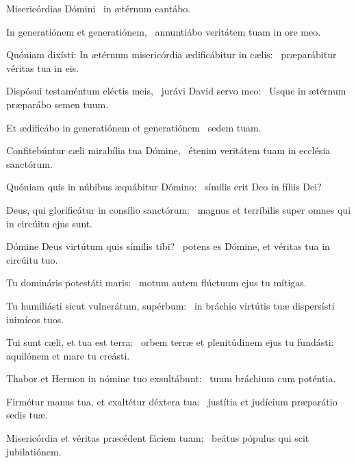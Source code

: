 \item Misericórdias Dómini~\psstar{} in ætérnum cantábo.

\item In generatiónem et generatiónem,~\psstar{} annuntiábo veritátem tuam in ore meo.

\item Quóniam dixísti: In ætérnum misericórdia ædificábitur in cælis:~\psstar{} præparábitur véritas tua in eis.

\item Dispósui testaméntum eléctis meis,~\pscross{} jurávi David servo meo:~\psstar{} Usque in ætérnum præparábo semen tuum.

\item Et ædificábo in generatiónem et generatiónem~\psstar{} sedem tuam.

\item Confitebúntur cæli mirabília tua Dómine,~\psstar{} étenim veritátem tuam in ecclésia sanctórum.

\item Quóniam quis in núbibus æquábitur Dómino:~\psstar{} símilis erit Deo in fíliis Dei?

\item Deus, qui glorificátur in consílio sanctórum:~\psstar{} magnus et terríbilis super omnes qui in circúitu ejus sunt.

\item Dómine Deus virtútum quis símilis tibi?~\psstar{} potens es Dómine, et véritas tua in circúitu tuo.

\item Tu domináris potestáti maris:~\psstar{} motum autem flúctuum ejus tu mítigas.

\item Tu humiliásti sicut vulnerá\-tum, supérbum:~\psstar{} in bráchio virtútis tuæ dispersísti inimícos tuos.

\item Tui sunt cæli, et tua est terra:~\pscross{} orbem terræ et plenitúdinem ejus tu fundásti:~\psstar{} aquilónem et mare tu creásti.

\item Thabor et Hermon in nómine tuo exsultábunt:~\psstar{} tuum bráchium cum poténtia.

\item Firmétur manus tua, et exaltétur déxtera tua:~\psstar{} justítia et judícium præparátio sedis tuæ.

\item Misericórdia et véritas præcédent fáciem tuam:~\psstar{} beátus pópulus qui scit jubilatiónem.

